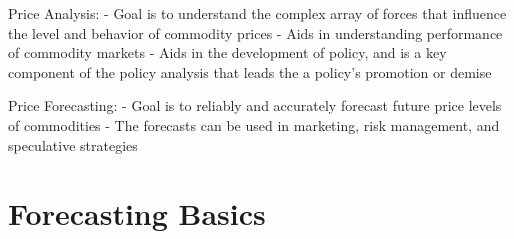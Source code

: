 \documentclass[
  letterpaper,
  DIV=11,
  numbers=noendperiod]{scrreprt}
\begin{document}
Price Analysis: - Goal is to understand the complex array of forces that
influence the level and behavior of commodity prices - Aids in
understanding performance of commodity markets - Aids in the development
of policy, and is a key component of the policy analysis that leads the
a policy's promotion or demise

Price Forecasting: - Goal is to reliably and accurately forecast future
price levels of commodities - The forecasts can be used in marketing,
risk management, and speculative strategies

\hypertarget{forecasting-basics}{%
\section{Forecasting Basics}\label{forecasting-basics}}
\end{document}

